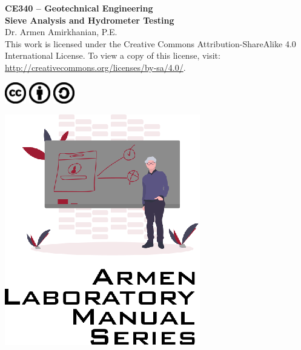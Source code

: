 \documentclass[12pt]{article}
\newcommand{\CourseNum}{CE340}
\newcommand{\CourseName}{Geotechnical Engineering}
\newcommand{\LabTitle}{Sieve Analysis and Hydrometer Testing}
\begin{document}
\begin{titlepage}
\begin{flushright}
\LARGE{\textbf{\CourseNum{} -- \CourseName}}\\
\vfill
\Huge{\textbf{\LabTitle}}\\
    \vfill
    \large Dr. Armen Amirkhanian, P.E.\\
\vfill
\normalsize This work is licensed under the Creative Commons Attribution-ShareAlike 4.0 International License. To view a copy of this license, visit:
\href{http://creativecommons.org/licenses/by-sa/4.0/}{http://creativecommons.org/licenses/by-sa/4.0/}.

\includegraphics[width=0.07\textwidth]{cc.eps}
\includegraphics[width=0.07\textwidth]{by.eps}
\includegraphics[width=0.07\textwidth]{sa.eps}
\vfill

\includegraphics[width=0.3\linewidth]{Logo.eps}\\ 
 
  
\end{flushright}
\end{titlepage}
\end{document}
